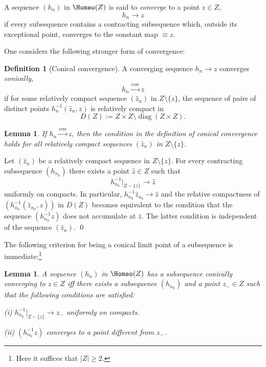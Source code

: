 \documentclass[12pt]{amsbook}%
\newtheorem{lem}[thm]{Lemma}
\theoremstyle{definition}
\newtheorem{defi}[thm]{Definition}
\theoremstyle{remark}
\numberwithin{section}{chapter}
\numberwithin{subsection}{section}
\numberwithin{figure}{chapter}
\DeclareMathOperator{\diag}{diag}
\begin{document}
A sequence $(h_n)$ in $\Homeo(Z)$
is said to {\em converge} to a point $z\in Z$,
\begin{equation}
\label{eq:convseqhm}
h_n\to z
\end{equation} 
if every subsequence contains a contracting subsequence 
which, outside its exceptional point, converges to the constant map $\equiv z$.

One considers the following stronger form of convergence:

\begin{defi}[Conical convergence]
A converging sequence $h_n\to z$
converges {\em conically},
\begin{equation}
\label{eq:convseqhmcon}
h_n\stackrel{con}{\to} z
\end{equation} 
if for some relatively compact sequence $(\hat z_n)$ in $Z\setminus \{z\}$,
the sequence of pairs of distinct points
$h_n^{-1}(\hat z_n,z)$ is relatively compact in 
$$D(Z):= Z\times Z\setminus \diag(Z\times Z).$$
\end{defi}


\begin{lem}
If $h_n\stackrel{con}{\to} z$,
then the condition in the definition of conical convergence 
holds for all relatively compact sequences $(\hat z_n)$ in $Z\setminus \{z\}$. 
\end{lem}
\proof
Let $(\hat z_n)$ be a relatively compact sequence in $Z\setminus\{z\}$. 
For every contracting subsequence $(h_{n_k})$
there exists a point $\hat z\in Z$ such that 
$$h^{-1}_{n_k}|_{Z-\{z\}}\to\hat z$$ uniformly on compacts.
In particular,
$h^{-1}_{n_k}\hat z_{n_k}\to\hat z$ 
and the relative compactness of $(h_{n_k}^{-1}(\hat z_{n_k},z))$ in $D(Z)$ 
becomes equivalent to the condition 
that the sequence $(h^{-1}_{n_k}z)$ does not accumulate at $\hat z$.
The latter condition is independent of the sequence $(\hat z_n)$.
\qed

\medskip
The following criterion for being a conical limit point of a subsequence is immediate:\footnote{Here
it suffices that $|Z|\geq2$.}
\begin{lem}
\label{lem:recogncnlimcv}
A sequence $(h_n)$ in $\Homeo(Z)$
has a subsequence conically converging to $z\in Z$
iff there exists a subsequence $(h_{n_k})$ and a point $z_-\in Z$
such that the following conditions are satisfied:

(i) 
$h_{n_k}^{-1}|_{Z-\{z\}}\to z_-$ uniformly on compacts.

(ii)
$(h_{n_k}^{-1}z)$ converges to a point different from $z_-$.
\end{lem}
\end{document}
